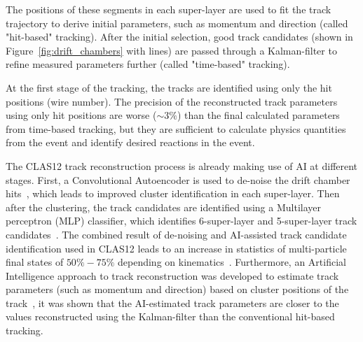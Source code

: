 \documentclass[a4paper,11pt]{article}
\begin{document}
The positions of these segments in each super-layer are used to fit the track trajectory 
to derive initial parameters, such as momentum and direction (called "hit-based" tracking).  After the initial selection, good track candidates 
(shown in Figure~\ref{fig:drift_chambers} with lines) are passed through a Kalman-filter to 
refine measured parameters further (called "time-based" tracking).

At the first stage of the tracking, the tracks are identified using only the hit positions (wire number). The precision 
of the reconstructed track parameters using only hit positions are worse ($\sim3\%$) than the final calculated parameters from time-based tracking, but they are sufficient to calculate physics quantities from the event and identify desired reactions in the event. 


The CLAS12 track reconstruction process is already making use of AI at different stages.
First, a Convolutional
Autoencoder is used to de-noise the drift chamber hits~\cite{Thomadakis:2022zcd}, which leads to improved cluster
identification in each super-layer. Then after the clustering, the track candidates are identified using a Multilayer perceptron (MLP) classifier,
which identifies 6-super-layer and 5-super-layer track candidates~\cite{Gavalian:2020oxg}. The combined result of
de-noising and AI-assisted track candidate identification used in CLAS12 leads to an increase in statistics of multi-particle 
final states of $50\%-75\%$ depending on kinematics~\cite{Gavalian:2020xmc}. 
Furthermore, an Artificial Intelligence approach to track reconstruction was developed to estimate track parameters 
(such as momentum and direction) based on cluster positions of the track~\cite{Thomadakis:2023ebe}, it was shown that 
the AI-estimated track parameters are closer to the values reconstructed using the Kalman-filter than the 
conventional hit-based tracking.
\end{document}
